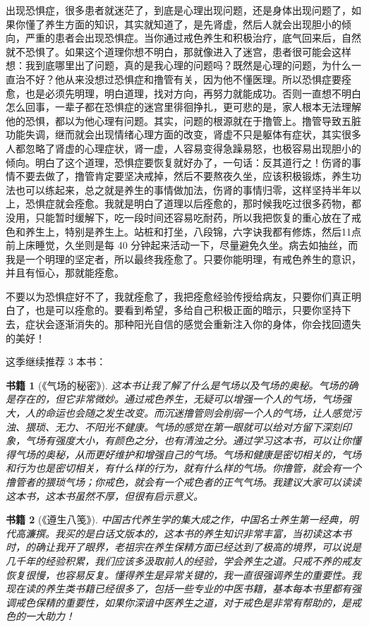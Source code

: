 \documentclass[fontset=founder]{ctexart}
\newtheorem{book}{书籍}
\begin{document}
出现恐惧症，很多患者就迷茫了，到底是心理出现问题，还是身体出现问题了，如果你懂了养生方面的知识，其实就知道了，是先肾虚，然后人就会出现胆小的倾向，严重的患者会出现恐惧症。当你通过戒色养生和积极治疗，底气回来后，自然就不恐惧了。如果这个道理你想不明白，那就像进入了迷宫，患者很可能会这样想：我到底哪里出了问题，真的是我心理的问题吗？既然是心理的问题，为什么一直治不好？他从来没想过恐惧症和撸管有关，因为他不懂医理。所以恐惧症要痊愈，也是必须先明理，明白道理，找对方向，再努力就能成功。否则一直想不明白怎么回事，一辈子都在恐惧症的迷宫里徘徊挣扎，更可悲的是，家人根本无法理解他的恐惧，都以为他心理有问题。其实，问题的根源就在于撸管上。撸管导致五脏功能失调，继而就会出现情绪心理方面的改变，肾虚不只是躯体有症状，其实很多人都忽略了肾虚的心理症状，肾一虚，人容易变得急躁易怒，也极容易出现胆小的倾向。明白了这个道理，恐惧症要恢复就好办了，一句话：反其道行之！伤肾的事情不要去做了，撸管肯定要坚决戒掉，然后不要熬夜久坐，应该积极锻炼，养生功法也可以练起来，总之就是养生的事情做加法，伤肾的事情归零，这样坚持半年以上，恐惧症就会痊愈。我就是明白了道理以后痊愈的，那时候我吃过很多药物，都没用，只能暂时缓解下，吃一段时间还容易吃耐药，所以我把恢复的重心放在了戒色和养生上，特别是养生上。站桩和打坐，八段锦，六字诀我都有修炼，然后11点前上床睡觉，久坐则是每 40 分钟起来活动一下，尽量避免久坐。病去如抽丝，而我是一个明理的坚定者，所以最终我痊愈了。只要你能明理，有戒色养生的意识，并且有恒心，那就能痊愈。

不要以为恐惧症好不了，我就痊愈了，我把痊愈经验传授给病友，只要你们真正明白了，也是可以痊愈的。要看到希望，多给自己积极正面的暗示，只要你坚持下去，症状会逐渐消失的。那种阳光自信的感觉会重新注入你的身体，你会找回遗失的美好！

这季继续推荐 3 本书：

\begin{book}[《气场的秘密》]
    这本书让我了解了什么是气场以及气场的奥秘。气场的确是存在的，但它非常微妙。通过戒色养生，无疑可以增强一个人的气场，气场强大，人的命运也会随之发生改变。而沉迷撸管则会削弱一个人的气场，让人感觉污浊、猥琐、无力、不阳光不健康。气场的感觉在第一眼就可以给对方留下深刻印象，气场有强度大小，有颜色之分，也有清浊之分。通过学习这本书，可以让你懂得气场的奥秘，从而更好维护和增强自己的气场。气场和健康是密切相关的，气场和行为也是密切相关，有什么样的行为，就有什么样的气场。你撸管，就会有一个撸管者的猥琐气场；你戒色，就会有一个戒色者的正气气场。我建议大家可以读读这本书，这本书虽然不厚，但很有启示意义。
\end{book}

\begin{book}[《遵生八笺》]
    中国古代养生学的集大成之作，中国名士养生第一经典，明代高濂撰。我买的是白话文版本的，这本书的养生知识非常丰富，当初读这本书时，的确让我开了眼界，老祖宗在养生保精方面已经达到了极高的境界，可以说是几千年的经验积累，我们应该多汲取前人的经验，学会养生之道。只戒不养的戒友恢复很慢，也容易反复。懂得养生是异常关键的，我一直很强调养生的重要性。我现在读的养生类书籍已经很多了，包括一些专业的中医书籍，基本每本书里都有强调戒色保精的重要性，如果你深谙中医养生之道，对于戒色是非常有帮助的，是戒色的一大助力！
\end{book}
\end{document}

